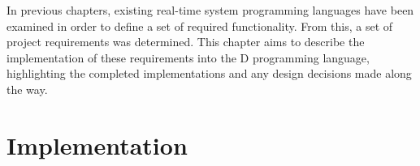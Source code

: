 








In previous chapters,
existing real-time system programming languages have been examined in order to
define a set of required functionality. From this, a set of project requirements 
was determined. 
This chapter aims to describe the implementation of these requirements into the D
programming language, highlighting the completed implementations and any design 
decisions made along the way. 

\section{Implementation}

